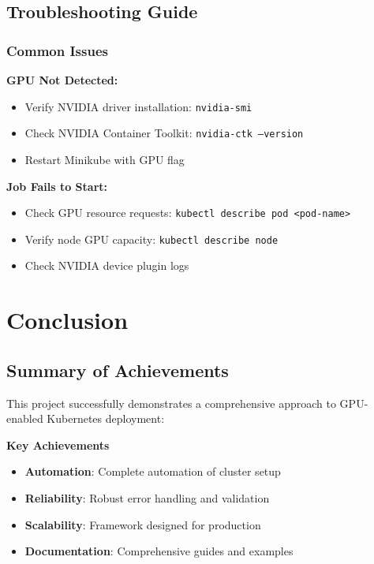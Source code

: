 \documentclass[12pt,a4paper]{report}
\begin{document}
\section{Troubleshooting Guide}
\subsection{Common Issues}
\textbf{GPU Not Detected:}
\begin{itemize}
    \item Verify NVIDIA driver installation: \texttt{nvidia-smi}
    \item Check NVIDIA Container Toolkit: \texttt{nvidia-ctk --version}
    \item Restart Minikube with GPU flag
\end{itemize}

\textbf{Job Fails to Start:}
\begin{itemize}
    \item Check GPU resource requests: \texttt{kubectl describe pod <pod-name>}
    \item Verify node GPU capacity: \texttt{kubectl describe node}
    \item Check NVIDIA device plugin logs
\end{itemize}

\chapter{Conclusion}
\label{chap:conclusion}

\section{Summary of Achievements}
This project successfully demonstrates a comprehensive approach to GPU-enabled Kubernetes deployment:

\begin{center}
\colorbox{primarycolor}{
    \color{white}\textbf{Key Achievements}
}
\end{center}

\vspace{0.3cm}

\begin{itemize}
    \item \textcolor{primarycolor}{\textbullet} \textbf{Automation}: Complete automation of cluster setup
    \item \textcolor{primarycolor}{\textbullet} \textbf{Reliability}: Robust error handling and validation
    \item \textcolor{primarycolor}{\textbullet} \textbf{Scalability}: Framework designed for production
    \item \textcolor{primarycolor}{\textbullet} \textbf{Documentation}: Comprehensive guides and examples
\end{itemize}
\end{document}
